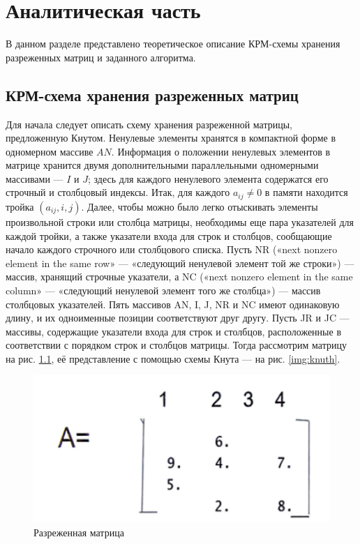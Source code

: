 \chapter{Аналитическая часть}

В данном разделе представлено теоретическое описание КРМ-схемы хранения разреженных матриц и заданного алгоритма.

\section{КРМ-схема хранения разреженных матриц}

Для начала следует описать схему хранения разреженной матрицы, предложенную Кнутом. Ненулевые элементы хранятся в компактной форме в одномерном массиве $AN$. Информация о положении ненулевых элементов в матрице хранится двумя дополнительными параллельными одномерными массивами --- $I$ и $J$; здесь для каждого ненулевого элемента содержатся его строчный и столбцовый индексы. Итак, для каждого $a_{ij} \neq 0$ в памяти находится тройка $(a_{ij}, i, j)$. Далее, чтобы можно было легко отыскивать элементы произвольной строки или столбца матрицы, необходимы еще пара указателей для каждой тройки, а также указатели входа для строк и столбцов, сообщающие начало каждого строчного или столбцового списка. Пусть NR («next nonzero element in the same row» --- «следующий ненулевой элемент той же строки») --- массив, хранящий строчные указатели, а NC («next nonzero element in the same column» --- «следующий ненулевой элемент того же столбца») --- массив столбцовых указателей.
Пять массивов AN, I, J, NR и NC имеют одинаковую длину, и их одноименные позиции соответствуют друг другу. Пусть JR и JC --- массивы, содержащие указатели входа для строк и столбцов, расположенные в соответствии с порядком строк и столбцов матрицы. Тогда рассмотрим матрицу на рис. \ref{img:matrix}, её представление с помощью схемы Кнута --- на рис. \ref{img:knuth}.

\begin{figure}[H]
	\begin{center}
		\includegraphics[scale=0.7]{img/matrix.png}
	\end{center}
	\captionsetup{justification=centering}
	\caption{Разреженная матрица}
	\label{img:matrix}
\end{figure}

